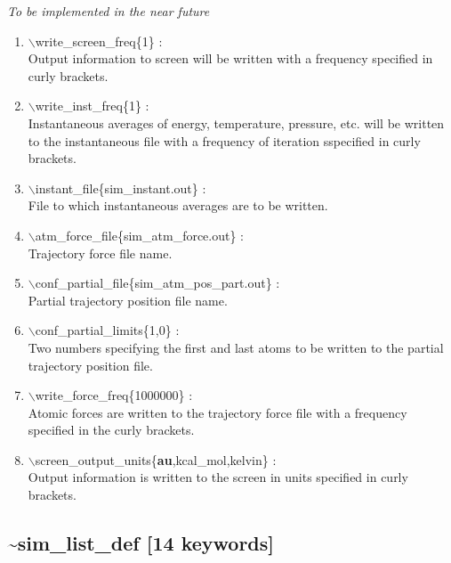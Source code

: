 \documentclass[12pt,titlepage]{article}
\begin{document}
{\it 
To be implemented in the near future
 \vspace{0.15in} 
 \begin{enumerate}
 \item   $\backslash$write\_screen\_freq\{1\} : \\
   Output information to screen will be written with a frequency specified
   in curly brackets.
 \item   $\backslash$write\_inst\_freq\{1\} : \\
     Instantaneous averages of energy, temperature, pressure, etc. will be 
     written to the instantaneous file with a frequency of iteration sspecified in curly 
     brackets.
 \item   $\backslash$instant\_file\{sim\_instant.out\} : \\
     File to which instantaneous averages are to be written.
    
 \item   $\backslash$atm\_force\_file\{sim\_atm\_force.out\} : \\
     Trajectory force file name.

 \item   $\backslash$conf\_partial\_file\{sim\_atm\_pos\_part.out\} : \\
     Partial trajectory position file name.

 \item   $\backslash$conf\_partial\_limits\{1,0\} : \\
   Two numbers specifying the first and last atoms to be written to
   the partial trajectory position file.

 \item   $\backslash$write\_force\_freq\{1000000\} : \\
   Atomic forces are written to the trajectory force file with a
   frequency specified in the curly brackets.

 \item   $\backslash$screen\_output\_units\{{\bf au},kcal\_mol,kelvin\} : \\
   Output information is written to the screen in units specified 
   in curly brackets.

   
\end{enumerate}
}


\newpage
\subsection*{\bf \~{}sim\_list\_def [14 keywords]}
\end{document}
